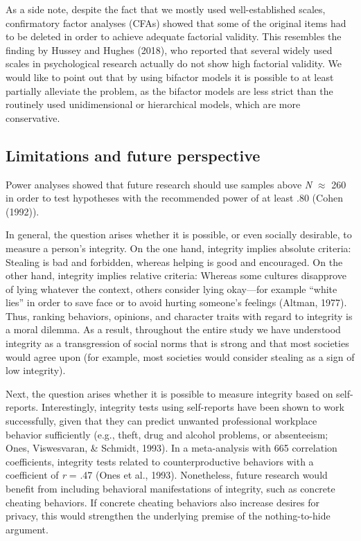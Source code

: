 \documentclass[man,floatsintext]{apa6}
\theoremstyle{definition}
\theoremstyle{definition}
\theoremstyle{definition}
\theoremstyle{remark}
\begin{document}
As a side note, despite the fact that we mostly used well-established
scales, confirmatory factor analyses (CFAs) showed that some of the
original items had to be deleted in order to achieve adequate factorial
validity. This resembles the finding by Hussey and Hughes (2018), who
reported that several widely used scales in psychological research
actually do not show high factorial validity. We would like to point out
that by using bifactor models it is possible to at least partially
alleviate the problem, as the bifactor models are less strict than the
routinely used unidimensional or hierarchical models, which are more
conservative.

\hypertarget{limitations-and-future-perspective}{%
\subsection{Limitations and future
perspective}\label{limitations-and-future-perspective}}

Power analyses showed that future research should use samples above
\emph{N} \(\approx\) 260 in order to test hypotheses with the
recommended power of at least .80 (Cohen (1992)).

In general, the question arises whether it is possible, or even socially
desirable, to measure a person's integrity. On the one hand, integrity
implies absolute criteria: Stealing is bad and forbidden, whereas
helping is good and encouraged. On the other hand, integrity implies
relative criteria: Whereas some cultures disapprove of lying whatever
the context, others consider lying okay---for example \enquote{white
lies} in order to save face or to avoid hurting someone's feelings
(Altman, 1977). Thus, ranking behaviors, opinions, and character traits
with regard to integrity is a moral dilemma. As a result, throughout the
entire study we have understood integrity as a transgression of social
norms that is strong and that most societies would agree upon (for
example, most societies would consider stealing as a sign of low
integrity).

Next, the question arises whether it is possible to measure integrity
based on self-reports. Interestingly, integrity tests using self-reports
have been shown to work successfully, given that they can predict
unwanted professional workplace behavior sufficiently (e.g., theft, drug
and alcohol problems, or absenteeism; Ones, Viswesvaran, \& Schmidt,
1993). In a meta-analysis with 665 correlation coefficients, integrity
tests related to counterproductive behaviors with a coefficient of
\emph{r} = .47 (Ones et al., 1993). Nonetheless, future research would
benefit from including behavioral manifestations of integrity, such as
concrete cheating behaviors. If concrete cheating behaviors also
increase desires for privacy, this would strengthen the underlying
premise of the nothing-to-hide argument.
\end{document}

